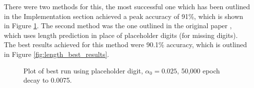 \documentclass[12pt]{article}
\begin{document}
There were two methods for this, the most successful one which has been outlined in the Implementation section achieved a peak accuracy of 91\%, which is shown in Figure \ref{fig:best_results}.
The second method was the one outlined in the original paper \cite{svhn_original_paper}, which uses length prediction in place of placeholder digits (for missing digits).
The best results achieved for this method were 90.1\% accuracy, which is outlined in Figure \ref{fig:length_best_results}.

\begin{figure}[!htb]
\centering
{}\hfill
{}\hfill
\caption{Plot of best run using placeholder digit, $\alpha_0 = 0.025$, 50,000 epoch decay to 0.0075.}
\label{fig:best_results}
\end{figure}
\end{document}
